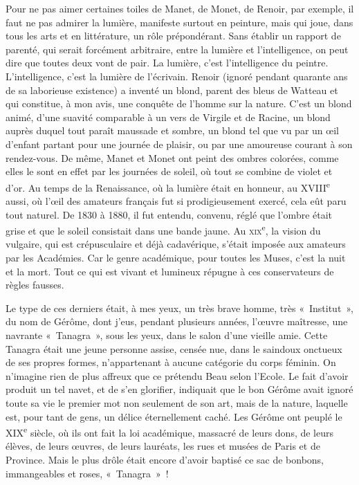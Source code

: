 \documentclass[french,twoside]{book} %
\begin{document}
Pour ne pas aimer certaines toiles de Manet, de Monet, de Renoir, par exemple, il faut ne pas admirer la lumière, manifeste surtout en peinture, mais qui joue, dans tous les arts et en littérature, un rôle prépondérant. Sans établir un rapport de parenté, qui serait forcément arbitraire, entre la lumière et l’intelligence, on peut dire que toutes deux vont de pair. La lumière, c’est l’intelligence du peintre. L’intelligence, c’est la lumière de l’écrivain. Renoir (ignoré pendant quarante ans de sa laborieuse existence) a inventé un blond, parent des bleus de Watteau et qui constitue, à mon avis, une conquête de l’homme sur la nature. C’est un blond animé, d’une suavité comparable à un vers de Virgile et de Racine, un blond auprès duquel tout paraît maussade et sombre, un blond tel que vu par un œil d’enfant partant pour une journée de plaisir, ou par une amoureuse courant à son rendez-vous. De même, Manet et Monet ont peint des ombres colorées, comme elles le sont en effet par les journées de soleil, où tout se combine de violet et d’or. Au temps de la Renaissance, où la lumière était en honneur, au XVIII\textsuperscript{e} aussi, où l’œil des amateurs français fut si prodigieusement exercé, cela eût paru tout naturel. De 1830 à 1880, il fut entendu, convenu, réglé que l’ombre était grise et que le soleil consistait dans une bande jaune. Au \textsc{xix}\textsuperscript{e}, la vision du vulgaire, qui est crépusculaire et déjà cadavérique, s’était imposée aux amateurs par les Académies. Car le genre académique, pour toutes les Muses, c’est la nuit et la mort. Tout ce qui est vivant et lumineux répugne à ces conservateurs de règles fausses.\par
Le type de ces derniers était, à mes yeux, un très brave homme, très « Institut », du nom de Gérôme, dont j’eus, pendant plusieurs années, l’œuvre maîtresse, une navrante « Tanagra », sous les yeux, dans le salon d’une vieille amie. Cette Tanagra était une jeune personne assise, censée nue, dans le saindoux onctueux de ses propres formes, n’appartenant à aucune catégorie du corps féminin. On n’imagine rien de plus affreux que ce prétendu Beau selon l’Ecole. Le fait d’avoir produit un tel navet, et de s’en glorifier, indiquait que le bon Gérôme avait ignoré toute sa vie le premier mot non seulement de son art, mais de la nature, laquelle est, pour tant de gens, un délice éternellement caché. Les Gérôme ont peuplé le XIX\textsuperscript{e} siècle, où ils ont fait la loi académique, massacré de leurs dons, de leurs élèves, de leurs œuvres, de leurs lauréats, les rues et musées de Paris et de Province. Mais le plus drôle était encore d’avoir baptisé ce sac de bonbons, immangeables et roses, « Tanagra » !\par
\end{document}
